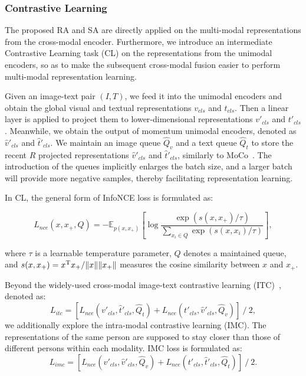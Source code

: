 \documentclass{article}
\begin{document}
\subsubsection{Contrastive Learning}
The proposed RA and SA are directly applied on the multi-modal representations from the cross-modal encoder.
Furthermore, we introduce an intermediate Contrastive Learning task (CL) on the representations from the unimodal encoders, so as to make the subsequent cross-modal fusion easier to perform multi-modal representation learning.

Given an image-text pair $(I, T)$, we feed it into the unimodal encoders and obtain the global visual and textual representations $v_{cls}$ and $t_{cls}$.
Then a linear layer is applied to project them to lower-dimensional representations $v'_{cls}$ and $t'_{cls}$.
Meanwhile, we obtain the output of momentum unimodal encoders, denoted as $\hat{v}'_{cls}$ and $\hat{t}'_{cls}$.
We maintain an image queue $\hat{Q}_v$ and a text queue $\hat{Q}_t$ to store the recent $R$ projected representations $\hat{v}'_{cls}$ and $\hat{t}'_{cls}$, similarly to MoCo~\cite{he2020momentum}. 
The introduction of the queues implicitly enlarges the batch size, and a larger batch will provide more negative samples, thereby facilitating representation learning.

In CL, the general form of InfoNCE loss is formulated as:
\begin{small}
\begin{equation}
    L_{nce}(x, x_+, Q) = -\mathbb{E}_{p(x, x_+)} [\log\frac{\exp(s(x, x_+)/\tau)}{\sum\limits_{x_i \in Q}\exp(s(x, x_i)/\tau)}], \label{equ7}
\end{equation}
\end{small}
where $\tau$ is a learnable temperature parameter, $Q$ denotes a maintained queue, and $s(x, x_+)=x^{\rm T}x_+/\lVert x\rVert\lVert x_+\rVert$ measures the cosine similarity between $x$ and $x_+$. 

Beyond the widely-used cross-modal image-text contrastive learning (ITC)~\cite{NEURIPS2021_50525975,radford2021learning}, denoted as:
\begin{equation}
    L_{itc} = [L_{nce}(v'_{cls}, \hat{t}'_{cls}, \hat{Q}_t) + L_{nce}(t'_{cls}, \hat{v}'_{cls}, \hat{Q}_v)]\ /\ 2, \label{equ8}
\end{equation}
we additionally explore the intra-modal contrastive learning (IMC).
The representations of the same person are supposed to stay closer than those of different persons within each modality. IMC loss is formulated as:
\begin{equation}
    L_{imc} = [L_{nce}(v'_{cls}, \hat{v}'_{cls}, \hat{Q}_v) + L_{nce}(t'_{cls}, \hat{t}'_{cls}, \hat{Q}_t)]\ /\ 2. \label{equ9}
\end{equation}
\end{document}
